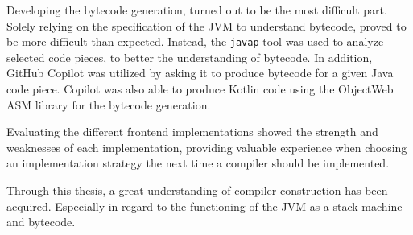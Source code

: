 Developing the bytecode generation, turned out to be the most difficult part. Solely relying on the specification of the JVM to understand bytecode, proved to be more difficult than expected. Instead, the \verb|javap| tool was used to analyze selected code pieces, to better the understanding of bytecode. In addition, GitHub Copilot was utilized by asking it to produce bytecode for a given Java code piece. Copilot was also able to produce Kotlin code using the ObjectWeb ASM library for the bytecode generation.

Evaluating the different frontend implementations showed the strength and weaknesses of each implementation, providing valuable experience when choosing an implementation strategy the next time a compiler should be implemented.

Through this thesis, a great understanding of compiler construction has been acquired. Especially in regard to the functioning of the JVM as a stack machine and bytecode. 
